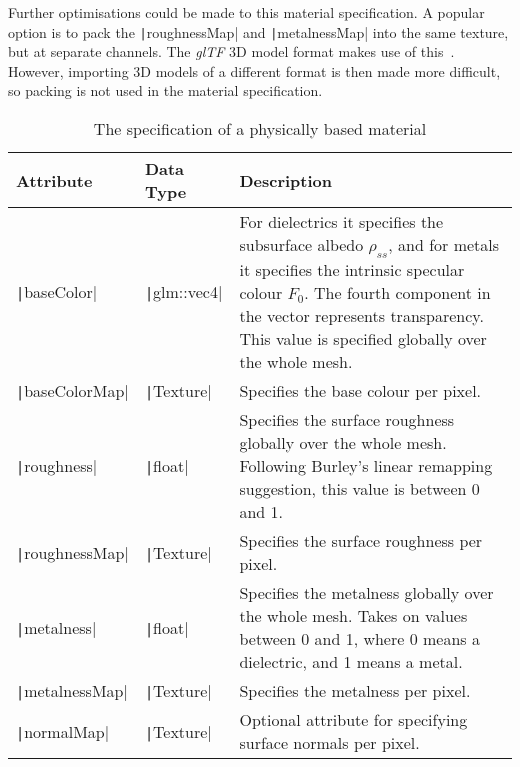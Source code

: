 Further optimisations could be made to this material specification. A popular option is to pack the \texttt|roughnessMap| and \texttt|metalnessMap| into the same texture, but at separate channels. The \textit{glTF} 3D model format makes use of this~\cite{glTFTexture}. However, importing 3D models of a different format is then made more difficult, so packing is not used in the material specification.

\begin{table}
	\noindent\begin{tabular}{|m{7em}|m{5em}|m{29em}|}
		\hline
		\textbf{Attribute} & \textbf{Data Type} & \textbf{Description} \\
		\hline\hline
		\texttt|baseColor| & \texttt|glm::vec4| & For dielectrics it specifies the subsurface albedo \begin{math}\rho_{ss}\end{math}, and for metals it specifies the intrinsic specular colour \begin{math}F_0\end{math}. The fourth component in the vector represents transparency. This value is specified globally over the whole mesh. \\
		\hline
		\texttt|baseColorMap| & \texttt|Texture| & Specifies the base colour per pixel. \\
		\hline
		\texttt|roughness| & \texttt|float| & Specifies the surface roughness globally over the whole mesh. Following Burley's linear remapping suggestion, this value is between 0 and 1. \\
		\hline
		\texttt|roughnessMap| & \texttt|Texture| & Specifies the surface roughness per pixel. \\
		\hline
		\texttt|metalness| & \texttt|float| & Specifies the metalness globally over the whole mesh. Takes on values between 0 and 1, where 0 means a dielectric, and 1 means a metal. \\
		\hline
		\texttt|metalnessMap| & \texttt|Texture| & Specifies the metalness per pixel. \\
		\hline
		\texttt|normalMap| & \texttt|Texture| & Optional attribute for specifying surface normals per pixel. \\
		\hline
	\end{tabular}
	\caption{The specification of a physically based material}
	\label{tb:PBRMaterial}
\end{table}

